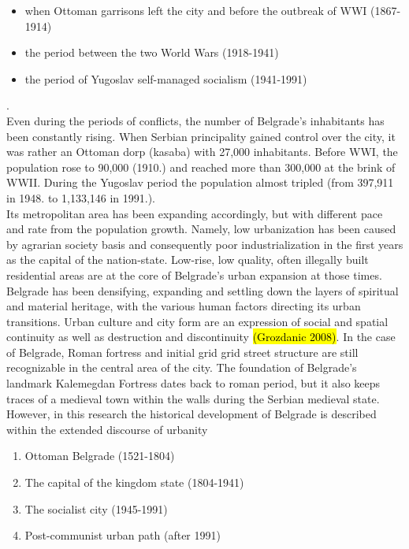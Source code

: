\documentclass[11pt]{report}
\begin{document}
\begin{itemize}
\item when Ottoman garrisons left the city and before the outbreak of WWI (1867-1914)
\item the period between the two World Wars (1918-1941)
\item  the period of Yugoslav self-managed socialism (1941-1991)
\end{itemize}
.
\\
Even during the periods of conflicts, the number of Belgrade's inhabitants has been constantly rising. When Serbian principality gained control over the city, it was rather an Ottoman dorp (kasaba) with 27,000 inhabitants. Before WWI, the population rose to 90,000 (1910.) and reached more than 300,000 at the brink of WWII. During the Yugoslav period the population almost tripled (from 397,911 in 1948. to 1,133,146 in 1991.).
\\
Its metropolitan area has been expanding accordingly, but with different pace and rate from the population growth. Namely, low urbanization has been caused by agrarian society basis and consequently poor industrialization in the first years as the capital of the nation-state. Low-rise, low quality, often illegally built residential areas are at the core of Belgrade's urban expansion at those times. Belgrade has been densifying, expanding and settling down the layers of spiritual and material heritage, with the various human factors directing its urban transitions. Urban culture 
and city form are an expression of social and spatial continuity as well as destruction and discontinuity \hl{(Grozdanic 2008)}. In the case of Belgrade, Roman fortress and initial grid grid street structure are still recognizable in the central area of the city. The foundation of Belgrade's landmark Kalemegdan Fortress dates back to roman period, but it also keeps traces of a medieval town within the walls during the Serbian medieval state. However, in this research the historical development of Belgrade is described within the extended discourse of urbanity
\begin{enumerate}
\item Ottoman Belgrade (1521-1804)
\item The capital of the kingdom state (1804-1941)
\item The socialist city (1945-1991)
\item Post-communist urban path (after 1991)
\end{enumerate}
\end{document}

